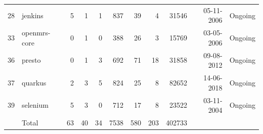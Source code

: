 \begin{table}
{\begin{tabular}{rlrrrrrrrrl}
28 & jenkins & 5 & 1 & 1 & 837 & 39 & 4 & 31546 & 05-11-2006 & Ongoing \\ 
33 & openmrs-core & 0 & 1 & 0 & 388 & 26 & 3 & 15769 & 03-05-2006 & Ongoing \\ 
36 & presto & 0 & 1 & 3 & 692 & 71 & 18 & 31858 & 09-08-2012 & Ongoing \\ 
37 & quarkus & 2 & 3 & 5 & 824 & 25 & 8 & 82652 & 14-06-2018 & Ongoing \\ 
39 & selenium & 5 & 3 & 0 & 712 & 17 & 8 & 23522 & 03-11-2004 & Ongoing \\ 
\hline 
 & Total & 63 & 40 & 34 & 7538 & 580 & 203 & 402733 &  & \\ 
\hline 
\bottomrule
\end{tabular}
}
\end{table} 
\newpage 
